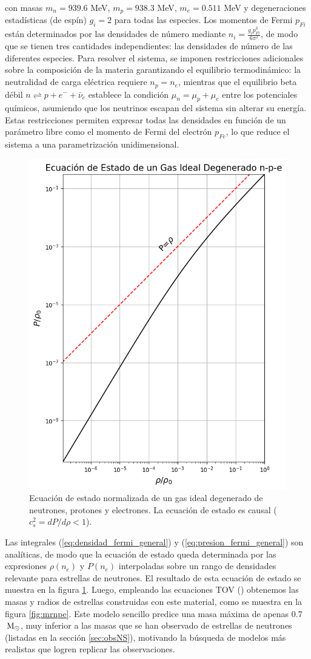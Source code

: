 con masas $m_n = 939.6$ MeV, $m_p = 938.3$ MeV, $m_e = 0.511$ MeV y degeneraciones estadísticas (de espín) $g_i = 2$ para todas las especies. Los momentos de Fermi $p_{Fi}$ están determinados por las densidades de número mediante $n_i = \frac{g_i p_{Fi}^3}{6\pi^2}$, de modo que se tienen tres cantidades independientes: las densidades de número de las diferentes especies. Para resolver el sistema, se imponen restricciones adicionales sobre la composición de la materia garantizando el equilibrio termodinámico: la neutralidad de carga eléctrica requiere $n_p = n_e$, mientras que el equilibrio beta débil $n \rightleftharpoons p + e^- + \bar{\nu}_e$ establece la condición $\mu_n = \mu_p + \mu_e$ entre los potenciales químicos, asumiendo que los neutrinos escapan del sistema sin alterar su energía. Estas restricciones permiten expresar todas las densidades en función de un parámetro libre como el momento de Fermi del electrón $p_{Fe}$, lo que reduce el sistema a una parametrización unidimensional.

\begin{figure}[h]
	\centering
	\includegraphics[width=0.55\linewidth]{Figuras/gas_npe}
	\caption[Ecuación de estado de gas ideal degenerado]{Ecuación de estado normalizada de un gas ideal degenerado de neutrones, protones y electrones. La ecuación de estado es causal ($c_s^2 = dP/d\rho < 1$).}
	\label{fig:eosnpe}
\end{figure}

Las integrales (\ref{eq:densidad_fermi_general}) y (\ref{eq:presion_fermi_general}) son analíticas, de modo que la ecuación de estado queda determinada por las expresiones $\rho(n_e)$ y $P(n_e)$ interpoladas sobre un rango de densidades relevante para estrellas de neutrones. El resultado de esta ecuación de estado se muestra en la figura \ref{fig:eosnpe}. Luego, empleando las ecuaciones TOV (\sistemaTOV) obtenemos las masas y radios de estrellas construidas con este material, como se muestra en la figura \ref{fig:mrnpe}. Este modelo sencillo predice una masa máxima de apenas 0.7$\,\text{M}_\odot$, muy inferior a las masas que se han observado de estrellas de neutrones (listadas en la sección \ref{sec:obsNS}), motivando la búsqueda de modelos más realistas que logren replicar las observaciones.

